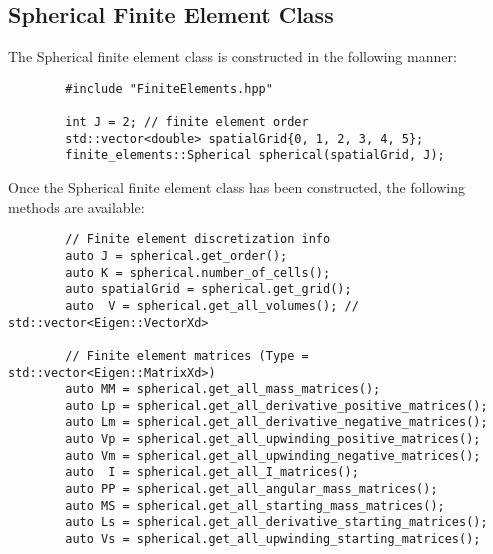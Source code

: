 \documentclass[../main.tex]{subfiles}
\begin{document}
    \subsection{Spherical Finite Element Class}
    The Spherical finite element class is constructed in the following manner:
    \begin{lstlisting}
        #include "FiniteElements.hpp"
        
        int J = 2; // finite element order
        std::vector<double> spatialGrid{0, 1, 2, 3, 4, 5};
        finite_elements::Spherical spherical(spatialGrid, J);
    \end{lstlisting}
    Once the Spherical finite element class has been constructed, the following methods are available:
    \begin{lstlisting}
        // Finite element discretization info
        auto J = spherical.get_order();
        auto K = spherical.number_of_cells();
        auto spatialGrid = spherical.get_grid();
        auto  V = spherical.get_all_volumes(); // std::vector<Eigen::VectorXd>
        
        // Finite element matrices (Type = std::vector<Eigen::MatrixXd>)
        auto MM = spherical.get_all_mass_matrices();
        auto Lp = spherical.get_all_derivative_positive_matrices();
        auto Lm = spherical.get_all_derivative_negative_matrices();
        auto Vp = spherical.get_all_upwinding_positive_matrices();
        auto Vm = spherical.get_all_upwinding_negative_matrices();
        auto  I = spherical.get_all_I_matrices();
        auto PP = spherical.get_all_angular_mass_matrices();
        auto MS = spherical.get_all_starting_mass_matrices();
        auto Ls = spherical.get_all_derivative_starting_matrices();
        auto Vs = spherical.get_all_upwinding_starting_matrices();
    \end{lstlisting}
    
\end{document}
